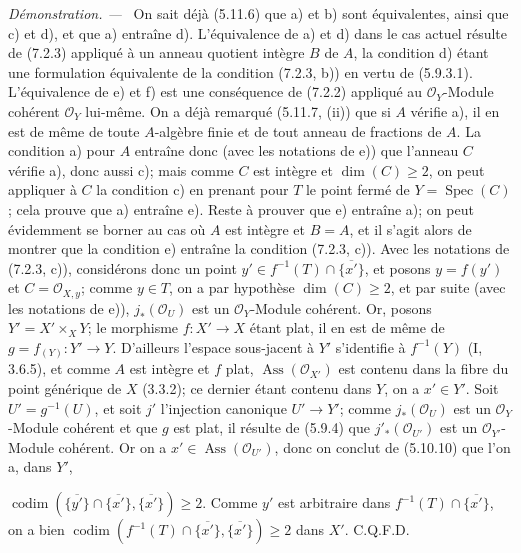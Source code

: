 \documentclass[10pt,oneside]{book}
\newcommand{\oldpage}[2][]{%
  \setcounter{footnote}{0}%
  \marginpar{\scriptsize\textbf{#1}~|~#2}\ignorespaces}
\newenvironment{proof}{%
  \par\medskip\noindent\textit{Démonstration. ---\ }}{\par}
\begin{document}
\begin{proof}
On sait déjà (5.11.6) que a) et b) sont équivalentes, ainsi que c) et d),
et que a) entraîne d). L'équivalence de a) et d) dans le cas actuel résulte
de (7.2.3) appliqué à un anneau quotient intègre $B$ de $A$, la condition
d) étant une formulation équivalente de la condition (7.2.3, b)) en vertu
de (5.9.3.1). L'équivalence de e) et f) est une conséquence de (7.2.2)
appliqué au $\mathscr O_Y$-Module cohérent $\mathscr O_Y$ lui-même. On a
déjà remarqué (5.11.7, (ii)) que si $A$ vérifie a), il en est de même de
toute $A$-algèbre finie et de tout anneau de fractions de $A$. La condition
a) pour $A$ entraîne donc (avec les notations de e)) que l'anneau $C$
vérifie a), donc aussi c); mais comme $C$ est intègre et $\dim(C)\geqslant
2$, on peut appliquer à $C$ la condition c) en prenant pour $T$ le point
fermé de $Y=\operatorname{Spec}(C)$; cela prouve que a) entraîne e). Reste
à prouver que e) entraîne a); on peut évidemment se borner au cas où $A$
est intègre et $B=A$, et il s'agit alors de montrer que la condition e)
entraîne la condition (7.2.3, c)). Avec les notations de (7.2.3, c)),
considérons donc un point
$y'\in f^{-1}(T)\cap\overline{\{x'\}}$, et posons $y=f(y')$ et
$C=\mathscr O_{X,y}$; comme $y\in T$, on a par hypothèse
$\dim(C)\geqslant2$, et par suite (avec les notations de e)),
$j_*(\mathscr O_U)$ est un $\mathscr O_Y$-Module cohérent. Or, posons
$Y'=X'\times_XY$; le morphisme $f:X'\to X$ étant plat, il en est de même de
$g=f_{(Y)}:Y'\to Y$. D'ailleurs l'espace sous-jacent à $Y'$ s'identifie à
$f^{-1}(Y)$ (I, 3.6.5), et comme $A$ est intègre et $f$ plat,
$\operatorname{Ass}(\mathscr O_{X'})$ est contenu dans la fibre du point
générique de $X$ (3.3.2); ce dernier étant contenu dans $Y$, on a
$x'\in Y'$. Soit $U'=g^{-1}(U)$, et soit $j'$ l'injection canonique
$U'\to Y'$; comme $j_*(\mathscr O_U)$ est un $\mathscr O_Y$-Module
cohérent et que $g$ est plat, il résulte de (5.9.4) que
$j'_*(\mathscr O_{U'})$ est un $\mathscr O_{Y'}$-Module cohérent. Or on a
$x'\in\operatorname{Ass}(\mathscr O_{U'})$, donc on conclut de (5.10.10)
que l'on a, dans $Y'$,

\oldpage[IV-2]{190}

$\operatorname{codim}(\overline{\{y'\}}\cap\overline{\{x'\}},
\overline{\{x'\}})\geqslant2$.
Comme $y'$ est arbitraire dans
$f^{-1}(T)\cap\overline{\{x'\}}$, on a bien
$\operatorname{codim}(f^{-1}(T)\cap\overline{\{x'\}},
\overline{\{x'\}})\geqslant2$ dans $X'$. C.Q.F.D.
\end{proof}
\end{document}
